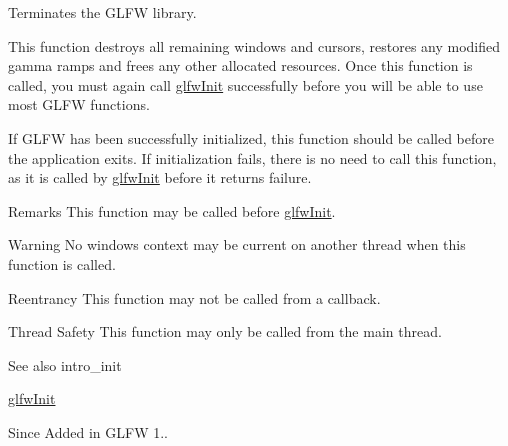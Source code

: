 Terminates the G\+L\+F\+W library. 

This function destroys all remaining windows and cursors, restores any modified gamma ramps and frees any other allocated resources. Once this function is called, you must again call \hyperlink{group__init_gab41771f0215a2e0afb4cf1cf98082d40}{glfw\+Init} successfully before you will be able to use most G\+L\+F\+W functions.

If G\+L\+F\+W has been successfully initialized, this function should be called before the application exits. If initialization fails, there is no need to call this function, as it is called by \hyperlink{group__init_gab41771f0215a2e0afb4cf1cf98082d40}{glfw\+Init} before it returns failure.

\begin{DoxyRemark}{Remarks}
This function may be called before \hyperlink{group__init_gab41771f0215a2e0afb4cf1cf98082d40}{glfw\+Init}.
\end{DoxyRemark}
\begin{DoxyWarning}{Warning}
No window\textquotesingle{}s context may be current on another thread when this function is called.
\end{DoxyWarning}
\begin{DoxyParagraph}{Reentrancy}
This function may not be called from a callback.
\end{DoxyParagraph}
\begin{DoxyParagraph}{Thread Safety}
This function may only be called from the main thread.
\end{DoxyParagraph}
\begin{DoxySeeAlso}{See also}
intro\+\_\+init 

\hyperlink{group__init_gab41771f0215a2e0afb4cf1cf98082d40}{glfw\+Init}
\end{DoxySeeAlso}
\begin{DoxySince}{Since}
Added in G\+L\+F\+W 1.. 
\end{DoxySince}
